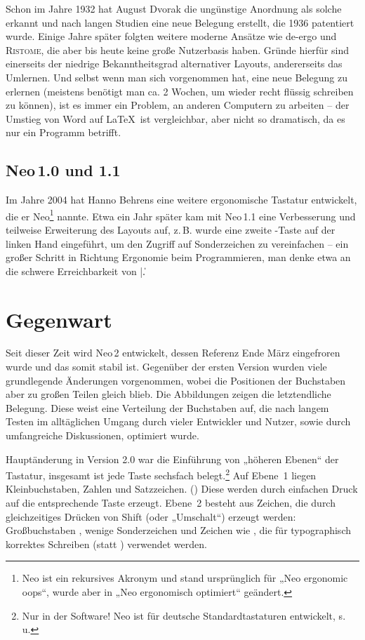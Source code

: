 \documentclass[ngerman]{dtk}
\newcommand{\taste}[1]{\makebox{\textsf{#1}}}
\newcommand\neoio{Neo\,1.0\xspace}
\newcommand\neoioi{Neo\,1.1\xspace}
\newcommand\neoii{Neo\,2\xspace}
\begin{document}
Schon im Jahre 1932 hat August Dvorak die ungünstige Anordnung als solche erkannt und nach langen Studien eine neue Belegung erstellt, die 1936 patentiert wurde. \cite{patentdvorak} Einige Jahre später folgten weitere moderne Ansätze wie de-ergo und \textsc{Ristome}, die aber bis heute keine große Nutzerbasis haben. \cite{deergo,ristome} Gründe hierfür sind einerseits der niedrige Bekanntheitsgrad alternativer Layouts, andererseits das Umlernen. Und selbst wenn man sich vorgenommen hat, eine neue Belegung zu erlernen (meistens benötigt man ca. 2 Wochen, um wieder recht flüssig schreiben zu können), ist es immer ein Problem, an anderen Computern zu arbeiten – der Umstieg von Word auf \LaTeX\ ist vergleichbar, aber nicht so dramatisch, da es nur ein Programm betrifft.

\subsection{\neoio und 1.1}
Im Jahre 2004 hat Hanno Behrens eine weitere ergonomische Tastatur entwickelt, die er Neo\footnote{Neo ist ein rekursives Akronym und stand ursprünglich für „Neo ergonomic oops“, wurde aber in „Neo ergonomisch optimiert“ geändert.} nannte. Etwa ein Jahr später kam mit \neoioi eine Verbesserung und teilweise Erweiterung des Layouts auf, z.\,B. wurde eine zweite \taste{Alt Gr}-Taste auf der linken Hand eingeführt, um den Zugriff auf Sonderzeichen zu vereinfachen – ein großer Schritt in Richtung Ergonomie beim Programmieren, man denke etwa an die schwere Erreichbarkeit von |{}\|.

\section{Gegenwart}
Seit dieser Zeit wird \neoii entwickelt, dessen Referenz Ende März eingefroren wurde und das somit stabil ist. \cite{neo2} Gegenüber der ersten Version wurden viele grundlegende Änderungen vorgenommen, wobei die Positionen der Buchstaben aber zu großen Teilen gleich blieb. Die Abbildungen zeigen die letztendliche Belegung. Diese weist eine Verteilung der Buchstaben auf, die nach langem Testen im alltäglichen Umgang durch vieler Entwickler und Nutzer, sowie durch umfangreiche Diskussionen, optimiert wurde.

Hauptänderung in Version 2.0 war die Einführung von „höheren Ebenen“ der Tastatur, insgesamt ist jede Taste sechsfach belegt.\footnote{Nur in der Software! Neo ist für deutsche Standardtastaturen entwickelt, s.\,u.} Auf Ebene~1 liegen Kleinbuchstaben, Zahlen und Satzzeichen. (\taste{abc.,}) Diese werden durch einfachen Druck auf die entsprechende Taste erzeugt. Ebene~2 besteht aus Zeichen, die durch gleichzeitiges Drücken von Shift (oder „Umschalt“) erzeugt werden: Großbuchstaben \taste{A}, wenige Sonderzeichen \taste{§} und Zeichen wie \taste{»« „“}, die für typographisch korrektes Schreiben (statt \taste{"}) verwendet werden.
\end{document}
